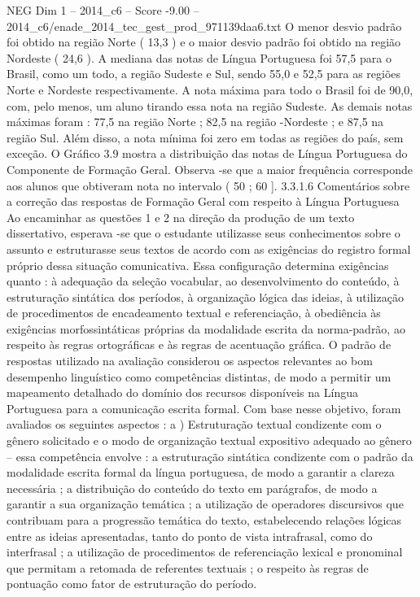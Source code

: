 \begin{textsample}{NEG Dim 1 – 2014\_c6 – Score -9.00 – 2014\_c6/enade\_2014\_tec\_gest\_prod\_971139daa6.txt}
O menor desvio padrão foi obtido na região Norte ( 13,3 ) e o maior desvio padrão foi obtido na região Nordeste ( 24,6 ).
A mediana das notas de Língua Portuguesa foi 57,5 para o Brasil, como um todo, a região Sudeste e Sul, sendo 55,0 e 52,5 para as regiões Norte e Nordeste respectivamente.
A nota máxima para todo o Brasil foi de 90,0, com, pelo menos, um aluno tirando essa nota na região Sudeste.
As demais notas máximas foram : 77,5 na região Norte ; 82,5 na região -Nordeste ; e 87,5 na região Sul.
Além disso, a nota mínima foi zero em todas as regiões do país, sem exceção.
O Gráfico 3.9 mostra a distribuição das notas de Língua Portuguesa do Componente de Formação Geral.
Observa -se que a maior frequência corresponde aos alunos que obtiveram nota no intervalo ( 50 ; 60 ]. 3.3.1.6 Comentários sobre a correção das respostas de Formação Geral com respeito à Língua Portuguesa Ao encaminhar as questões 1 e 2 na direção da produção de um texto dissertativo, esperava -se que o estudante utilizasse seus conhecimentos sobre o assunto e estruturasse seus textos de acordo com as exigências do registro formal próprio dessa situação comunicativa.
Essa configuração determina exigências quanto : à adequação da seleção vocabular, ao desenvolvimento do conteúdo, à estruturação sintática dos períodos, à organização lógica das ideias, à utilização de procedimentos de encadeamento textual e referenciação, à obediência às exigências morfossintáticas próprias da modalidade escrita da norma-padrão, ao respeito às regras ortográficas e às regras de acentuação gráfica.
O padrão de respostas utilizado na avaliação considerou os aspectos relevantes ao bom desempenho linguístico como competências distintas, de modo a permitir um mapeamento detalhado do domínio dos recursos disponíveis na Língua Portuguesa para a comunicação escrita formal.
Com base nesse objetivo, foram avaliados os seguintes aspectos : a ) Estruturação textual condizente com o gênero solicitado e o modo de organização textual expositivo adequado ao gênero – essa competência envolve : a estruturação sintática condizente com o padrão da modalidade escrita formal da língua portuguesa, de modo a garantir a clareza necessária ; a distribuição do conteúdo do texto em parágrafos, de modo a garantir a sua organização temática ; a utilização de operadores discursivos que contribuam para a progressão temática do texto, estabelecendo relações lógicas entre as ideias apresentadas, tanto do ponto de vista intrafrasal, como do interfrasal ; a utilização de procedimentos de referenciação lexical e pronominal que permitam a retomada de referentes textuais ; o respeito às regras de pontuação como fator de estruturação do período.

\end{textsample}
